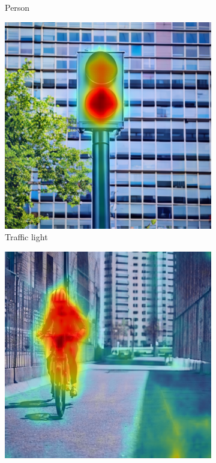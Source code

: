 \begin{figure}
\begin{subfigure}{0.24\columnwidth}
   \caption{Person}
   \label{subfig:dataset-example-person-daam-linear-optimized}
  \end{subfigure}
  \begin{subfigure}{0.24\columnwidth}
   \includegraphics[width=\columnwidth]{img/4-experiments/example_daam_heatmap_light_2_epochs500.png}
   \caption{Traffic light}
   \label{subfig:dataset-example-traffic-daam-linear-optimized}
  \end{subfigure}
  \begin{subfigure}{0.24\columnwidth}
   \includegraphics[width=\columnwidth]{img/4-experiments/example_daam_heatmap_rider_2_epochs500.png}

\end{subfigure}
\end{figure}
